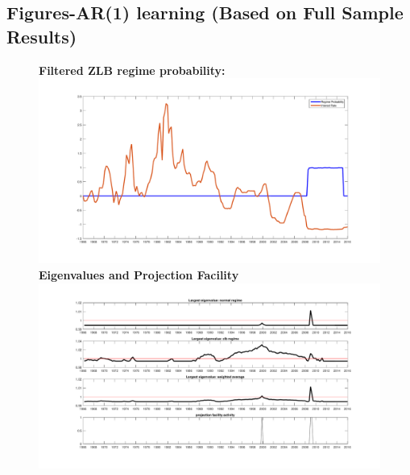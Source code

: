 \documentclass[12pt,reqno]{article}
\numberwithin{equation}{section}
\begin{document}
\subsection*{Figures-AR(1) learning (Based on Full Sample Results)}
\begin{figure}[H]
\textbf{Filtered ZLB regime probability:}\\
\includegraphics[scale=0.5]{sw_ar1_regimeProb.pdf}\\
\textbf{Eigenvalues and Projection Facility}\\
\includegraphics[scale=0.5]{sw_ar1_eigenvalues.pdf}
\end{figure}
\end{document}
